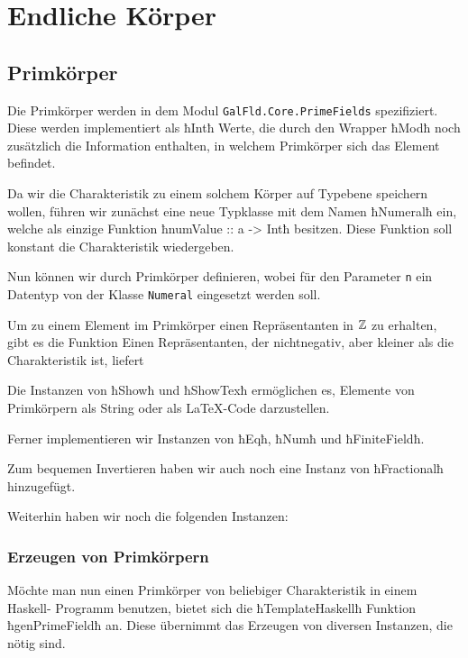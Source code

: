 \section{Endliche Körper}
\subsection{Primkörper}
Die Primkörper werden in dem Modul \texttt{GalFld.Core.PrimeFields}
spezifiziert. Diese werden implementiert als ħIntħ Werte, die durch den Wrapper
ħModħ noch zusätzlich die Information enthalten, in welchem 
Primkörper sich das Element befindet.

Da wir die Charakteristik zu einem solchem Körper auf Typebene speichern
wollen, führen wir zunächst eine neue Typklasse mit dem Namen
ħNumeralħ ein, welche als einzige Funktion 
ħnumValue :: a -> Intħ besitzen.
Diese Funktion soll konstant die Charakteristik wiedergeben.

Nun können wir durch
Primkörper definieren, wobei für den Parameter \texttt{n} ein
Datentyp von der Klasse \texttt{Numeral} eingesetzt werden soll.

Um zu einem Element im Primkörper einen Repräsentanten in $\mathbb{Z}$ zu erhalten, gibt
es die Funktion
Einen Repräsentanten, der nichtnegativ, aber kleiner als die Charakteristik ist,
liefert

Die Instanzen von ħShowħ und ħShowTexħ ermöglichen es, Elemente von Primkörpern
als String oder als \LaTeX{}-Code darzustellen.

Ferner implementieren wir Instanzen von ħEqħ, ħNumħ und ħFiniteFieldħ.

Zum bequemen Invertieren haben wir auch noch eine Instanz von ħFractionalħ
hinzugefügt.

Weiterhin haben wir noch die folgenden Instanzen:

\subsubsection{Erzeugen von Primkörpern}
Möchte man nun einen Primkörper von beliebiger Charakteristik in einem 
Haskell- Programm benutzen,
bietet sich die ħTemplateHaskellħ Funktion ħgenPrimeFieldħ an. Diese
übernimmt das Erzeugen von diversen Instanzen, die nötig sind.

